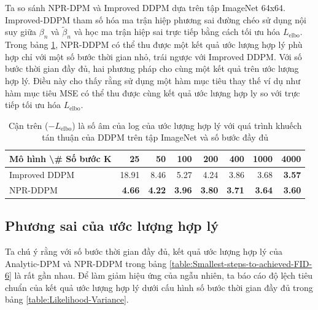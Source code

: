 \documentclass[14pt, a4paper]{article}
\numberwithin{equation}{section}
\numberwithin{figure}{section}
\numberwithin{dl}{section}
\numberwithin{md}{section}
\numberwithin{bd}{section}
\numberwithin{dn}{section}
\numberwithin{hq}{section}
\begin{document}
    Ta so sánh NPR-DPM và Improved DDPM \cite{nichol2021improved} dựa trên tập ImageNet 64x64.
    Improved-DDPM tham số hóa ma trận hiệp phương sai đường chéo sử dụng nội suy giữa $\beta_n$ và $\tilde{\beta}_n$ và học ma trận hiệp sai trực tiếp bằng cách tối ưu hóa $L_{\mathrm{elbo}}$.
    Trong bảng \ref{table:Likelihood-comparison}, NPR-DDPM có thể thu được một kết quả ước lượng hợp lý phù hợp chỉ với một số bước thời gian nhỏ, trái ngược với Improved DDPM.
    Với số bước thời gian đầy đủ, hai phương pháp cho cùng một kết quả trên ước lượng hợp lý.
    Điều này cho thấy rằng sử dụng một hàm mục tiêu thay thế ví dụ như hàm mục tiêu MSE có thể thu được cùng kết quả ước lượng hợp ly so với trực tiếp tối ưu hóa $L_{\mathrm{elbo}}$.

    \begin{table}[h!]
        \caption{Cận trên ($-L_{\mathrm{elbo}}$) là số âm của log của ước lượng hợp lý với quá trình khuếch tán thuận của DDPM trên tập ImageNet và số bước đầy đủ}
        \begin{center}
            \begin{tabular}{lrrrrrrr}
                \hline
                Mô hình \textbackslash \# Số bước K & 25 & 50 & 100 & 200 & 400 & 1000 & 4000 \\
                \hline
                Improved DDPM &  18.91 & 8.46 & 5.27 & 4.24 & 3.86 & 3.68 & \textbf{3.57} \\
                NPR-DDPM & \textbf{4.66} & \textbf{4.22} & \textbf{3.96} & \textbf{3.80} & \textbf{3.71} & \textbf{3.64} & \textbf{3.60} \\
                \hline
            \end{tabular}
        \end{center}
        \label{table:Likelihood-comparison}
    \end{table}

    \subsection{Phương sai của ước lượng hợp lý}

    Ta chú ý rằng với số bước thời gian đầy đủ, kết quả ước lượng hợp lý của Analytic-DPM và NPR-DDPM trong bảng \ref{table:Smallest-steps-to-achieved-FID-6} là rất gần nhau.
    Để làm giảm hiệu ứng của ngẫu nhiên, ta báo cáo độ lệch tiêu chuẩn của kết quả ước lượng hợp lý dưới cấu hình số bước thời gian đầy đủ trong bảng \ref{table:Likelihood-Variance}.
\end{document}
